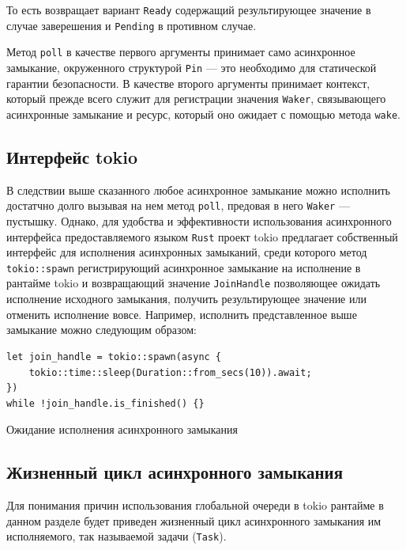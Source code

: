 То есть возвращает вариант \verb|Ready| содержащий результирующее значение в случае заверешения и \verb|Pending| в противном случае.

Метод \verb|poll| в качестве первого аргументы принимает само асинхронное замыкание, окруженного структурой \verb|Pin| --- это необходимо для статической гарантии безопасности. В качестве второго аргументы принимает контекст, который прежде всего служит для регистрации значения \verb|Waker|, связывающего асинхронные замыкание и ресурс, который оно ожидает с помощью метода \verb|wake|.

\subsection{Интерфейс tokio}

В следствии выше сказанного любое асинхронное замыкание можно исполнить достатчно долго вызывая на нем метод \verb|poll|, предовая в него \verb|Waker| --- пустышку. Однако, для удобства и эффективности использования асинхронного интерфейса предоставляемого языком \verb|Rust| проект tokio предлагает собственный интерфейс для исполнения асинхронных замыканий, среди которого метод \verb|tokio::spawn| регистрирующий асинхронное замыкание на исполнение в рантайме tokio и возвращающий значение \verb|JoinHandle| позволяющее ожидать исполнение исходного замыкания, получить результирующее значение или отменить исполнение вовсе. Например, исполнить представленное выше замыкание можно следующим образом:

\begin{listing}[H]
    \begin{verbatim}
let join_handle = tokio::spawn(async {
    tokio::time::sleep(Duration::from_secs(10)).await;
})
while !join_handle.is_finished() {}
    \end{verbatim}

    \caption{Ожидание исполнения асинхронного замыкания}
    \label{listing:tokio_spawn::sleep}
\end{listing}

\subsection{Жизненный цикл асинхронного замыкания}

Для понимания причин использования глобальной очереди в tokio рантайме в данном разделе будет приведен жизненный цикл асинхронного замыкания им исполняемого, так называемой задачи (\verb|Task|).

